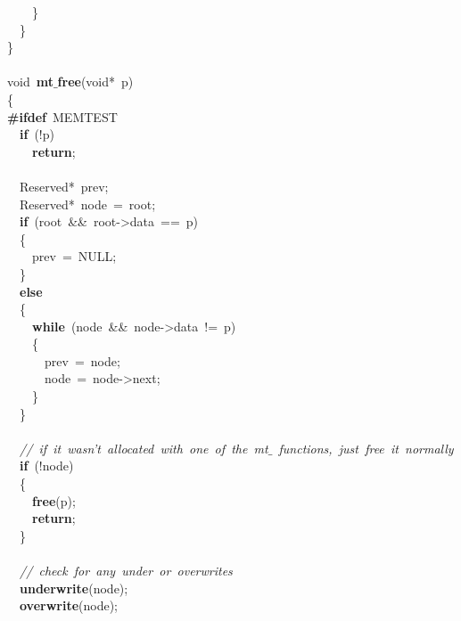 \documentclass{article}
\begin{document}
\mbox{}\ \ \ \ \} \\
\mbox{}\ \ \} \\
\mbox{}\} \\
\mbox{} \\
\mbox{}void\ \textbf{mt$\_$free}(void*\ p) \\
\mbox{}\{ \\
\mbox{}\textbf{\#ifdef}\ MEMTEST \\
\mbox{}\ \ \textbf{if}\ (!p) \\
\mbox{}\ \ \ \ \textbf{return}; \\
\mbox{} \\
\mbox{}\ \ Reserved*\ prev; \\
\mbox{}\ \ Reserved*\ node\ =\ root; \\
\mbox{}\ \ \textbf{if}\ (root\ \&\&\ root-\textgreater{}data\ ==\ p) \\
\mbox{}\ \ \{ \\
\mbox{}\ \ \ \ prev\ =\ NULL; \\
\mbox{}\ \ \} \\
\mbox{}\ \ \textbf{else} \\
\mbox{}\ \ \{ \\
\mbox{}\ \ \ \ \textbf{while}\ (node\ \&\&\ node-\textgreater{}data\ !=\ p) \\
\mbox{}\ \ \ \ \{ \\
\mbox{}\ \ \ \ \ \ prev\ =\ node; \\
\mbox{}\ \ \ \ \ \ node\ =\ node-\textgreater{}next; \\
\mbox{}\ \ \ \ \} \\
\mbox{}\ \ \} \\
\mbox{} \\
\mbox{}\ \ \textit{//\ if\ it\ wasn't\ allocated\ with\ one\ of\ the\ mt$\_$\ functions,\ just\ free\ it\ normally} \\
\mbox{}\ \ \textbf{if}\ (!node) \\
\mbox{}\ \ \{ \\
\mbox{}\ \ \ \ \textbf{free}(p); \\
\mbox{}\ \ \ \ \textbf{return}; \\
\mbox{}\ \ \} \\
\mbox{} \\
\mbox{}\ \ \textit{//\ check\ for\ any\ under\ or\ overwrites} \\
\mbox{}\ \ \textbf{underwrite}(node); \\
\mbox{}\ \ \textbf{overwrite}(node); \\
\mbox{} \\
\end{document}
